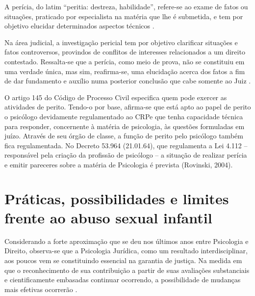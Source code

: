 A perícia, do latim ``peritia: destreza, habilidade'', refere-se ao exame de fatos ou situações, praticado por especialista na matéria que lhe é submetida, e tem por objetivo elucidar determinados aspectos técnicos .

Na área judicial, a investigação pericial tem por objetivo clarificar situações e fatos controversos, provindos de conflitos de interesses relacionados a um direito contestado. Ressalta-se que a perícia, como meio de prova, não se constituiu em uma verdade única, mas sim, reafirma-se, uma elucidação acerca dos fatos a fim de dar fundamento e auxílio numa posterior conclusão que cabe somente ao Juiz \cite{ROVINSKI2004}.

O artigo 145 do Código de Processo Civil especifica quem pode exercer as atividades de perito. Tendo-o por base, afirma-se que está apto ao papel de perito o psicólogo devidamente regulamentado ao CRP\footnotemark e que tenha capacidade técnica para responder, concernente à matéria de psicologia, às questões formuladas em juízo. Através de seu órgão de classe, a função de perito pelo psicólogo também fica regulamentada. No Decreto 53.964 (21.01.64), que regulamenta a Lei 4.112 -- responsável pela criação da profissão de psicólogo -- a situação de realizar perícia e emitir pareceres sobre a matéria de Psicologia é prevista (Rovinski, 2004).


\section{Práticas, possibilidades e limites frente ao abuso sexual infantil}

Considerando a forte aproximação que se deu nos últimos anos entre Psicologia e Direito, observa-se que a Psicologia Jurídica, como um resultado interdisciplinar, aos poucos vem se constituindo essencial na garantia de justiça. Na medida em que o reconhecimento de sua contribuição a partir de suas avaliações substanciais e cientificamente embasadas continuar ocorrendo, a possibilidade de mudanças mais efetivas ocorrerão . 

